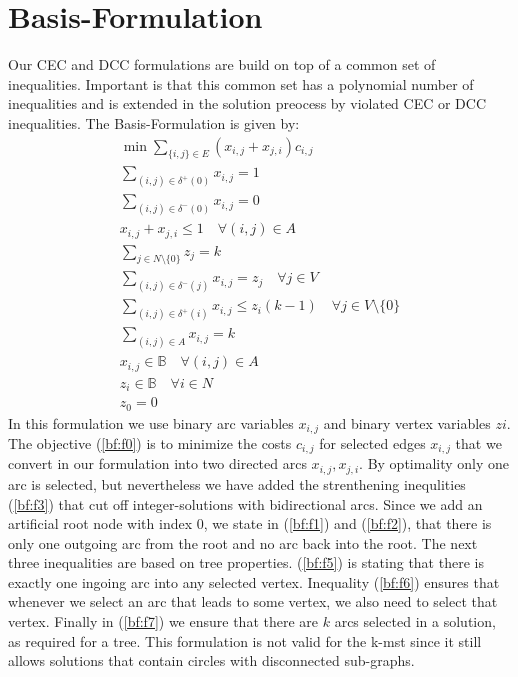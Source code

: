 \documentclass[11pt]{article}
\begin{document}
\section{Basis-Formulation}
Our CEC and DCC formulations are build on top of a common set of inequalities. Important is that this common set has a polynomial number of inequalities and is extended in the solution preocess by violated CEC or DCC inequalities. The Basis-Formulation is given by:
\begin{gather}
  \min\sum\limits_{\{i,j\}\in E}(x_{i,j}+ x_{j,i})c_{i,j} \label{bf:f0}\\
  \sum\limits_{(i,j)\in \delta^+(0) } x_{i,j} =1 \label{bf:f1}\\
  \sum\limits_{(i,j)\in \delta^-(0) } x_{i,j} =0 \label{bf:f2}\\
  x_{i,j}+x_{j,i} \leq 1  \quad \forall (i,j)\in A \label{bf:f3}\\
  \sum\limits_{j\in N\setminus \{0\}} z_j = k \label{bf:f4}\\
  \sum\limits_{(i,j)\in \delta^-(j) } x_{i,j} =z_j  \quad \forall j\in V \label{bf:f5}\\
  \sum\limits_{(i,j)\in \delta^+(i) } x_{i,j} \leq z_i(k-1)  \quad \forall j\in V\setminus\{0\} \label{bf:f6}\\
  \sum\limits_{(i,j)\in A } x_{i,j} =k  \label{bf:f7}\\
  x_{i,j} \in \mathbb{B} \quad \forall (i,j)\in A\label{bf:f7}\\
  z_{i} \in \mathbb{B} \quad \forall i \in N\label{bf:f8}\\
  z_{0} = 0 \label{bf:f10}
\end{gather}
In this formulation we use binary arc variables $x_{i,j}$ and binary vertex variables $z{i}$.
The objective (\ref{bf:f0}) is to minimize the costs $c_{i,j}$ for selected edges $x_{i,j}$ that we convert in our formulation into two directed arcs $x_{i,j}, x_{j,i}$. By optimality only one arc is selected, but nevertheless we have added the strenthening inequlities (\ref{bf:f3}) that cut off integer-solutions with bidirectional arcs. Since we add an artificial root node with index $0$, we state in (\ref{bf:f1}) and (\ref{bf:f2}), that there is only one outgoing arc from the root and no arc back into the root. The next three inequalities are based on tree properties. (\ref{bf:f5}) is stating that there is exactly one ingoing arc into any selected vertex. Inequality (\ref{bf:f6}) ensures that whenever we select an arc that leads to some vertex, we also need to select that vertex. Finally in (\ref{bf:f7}) we ensure that there are $k$ arcs selected in a solution, as required for a tree. This formulation is not valid for the k-mst since it still allows solutions that contain circles with disconnected sub-graphs.
\end{document}
